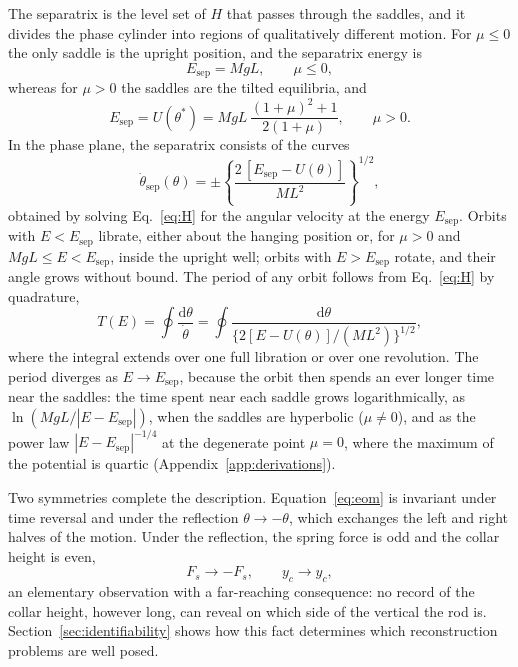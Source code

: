 The separatrix is the level set of $H$ that passes through the saddles, and it divides the phase cylinder into regions of qualitatively different motion. For $\mu\le0$ the only saddle is the upright position, and the separatrix energy is
\begin{equation}
E_{\mathrm{sep}} = MgL ,\qquad \mu\le0,
\label{eq:Esep_neg}
\end{equation}
whereas for $\mu>0$ the saddles are the tilted equilibria, and
\begin{equation}
E_{\mathrm{sep}} = U(\theta^{*}) = MgL\,\frac{(1+\mu)^{2}+1}{2(1+\mu)},\qquad \mu>0 .
\label{eq:Esep}
\end{equation}
In the phase plane, the separatrix consists of the curves
\begin{equation}
\dot\theta_{\mathrm{sep}}(\theta) = \pm\left\{\frac{2\,[E_{\mathrm{sep}}-U(\theta)]}{ML^{2}}\right\}^{1/2},
\label{eq:sep_curve}
\end{equation}
obtained by solving Eq.~\eqref{eq:H} for the angular velocity at the energy $E_{\mathrm{sep}}$. Orbits with $E<E_{\mathrm{sep}}$ librate, either about the hanging position or, for $\mu>0$ and $MgL\le E<E_{\mathrm{sep}}$, inside the upright well; orbits with $E>E_{\mathrm{sep}}$ rotate, and their angle grows without bound. The period of any orbit follows from Eq.~\eqref{eq:H} by quadrature,
\begin{equation}
T(E) = \oint\frac{\mathrm d\theta}{\dot\theta}
= \oint\frac{\mathrm d\theta}{\{2[E-U(\theta)]/(ML^{2})\}^{1/2}},
\label{eq:period}
\end{equation}
where the integral extends over one full libration or over one revolution. The period diverges as $E\to E_{\mathrm{sep}}$, because the orbit then spends an ever longer time near the saddles: the time spent near each saddle grows logarithmically, as $\ln(MgL/|E-E_{\mathrm{sep}}|)$, when the saddles are hyperbolic ($\mu\ne0$), and as the power law $|E-E_{\mathrm{sep}}|^{-1/4}$ at the degenerate point $\mu=0$, where the maximum of the potential is quartic (Appendix~\ref{app:derivations}).

Two symmetries complete the description. Equation~\eqref{eq:eom} is invariant under time reversal and under the reflection $\theta\to-\theta$, which exchanges the left and right halves of the motion. Under the reflection, the spring force is odd and the collar height is even,
\begin{equation}
F_s\to-F_s,\qquad y_c\to y_c ,
\label{eq:reflection}
\end{equation}
an elementary observation with a far-reaching consequence: no record of the collar height, however long, can reveal on which side of the vertical the rod is. Section~\ref{sec:identifiability} shows how this fact determines which reconstruction problems are well posed.
